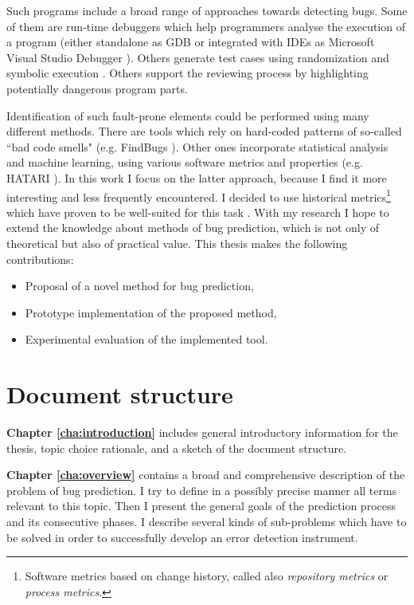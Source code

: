 \documentclass{pracamgr}
\begin{document}
Such programs include a broad range of approaches towards detecting bugs. Some of them are run-time debuggers which help programmers analyse the execution of a program (either standalone as GDB \cite{gdb} or integrated with IDEs as Microsoft Visual Studio Debugger \cite{vs_debugger}). Others generate test cases using randomization and symbolic execution \cite{symbolic, puzzle}. Others support the reviewing process by highlighting potentially dangerous program parts.

Identification of such fault-prone elements could be performed using many different methods. There are tools which rely on hard-coded patterns of so-called ``bad code smells" (e.g. FindBugs \cite{findbugs}). Other ones incorporate statistical analysis and machine learning, using various software metrics and properties (e.g. HATARI \cite{hatari}). In this work I focus on the latter approach, because I find it more interesting and less frequently encountered. I decided to use historical metrics\footnote{Software metrics based on change history, called also \emph{repository metrics} or \emph{process metrics}.} which have proven to be well-suited for this task \cite{merits, comparative, how_and_why}. With my research I hope to extend the knowledge about methods of bug prediction, which is not only of theoretical but also of practical value. This thesis makes the following contributions:
\begin{itemize}
	\item Proposal of a novel method for bug prediction,
	\item Prototype implementation of the proposed method,
	\item Experimental evaluation of the implemented tool.
\end{itemize}

\section{Document structure}
\label{sec:structure}

\textbf{Chapter \ref{cha:introduction}} includes general introductory information for the thesis, topic choice rationale, and a sketch of the document structure. 

\medskip \noindent
\textbf{Chapter \ref{cha:overview}} contains a broad and comprehensive description of the problem of bug prediction. I try to define in a possibly precise manner all terms relevant to this topic. Then I present the general goals of the prediction process and its consecutive phases. I describe several kinds of sub-problems which have to be solved in order to successfully develop an error detection instrument.
\end{document}
